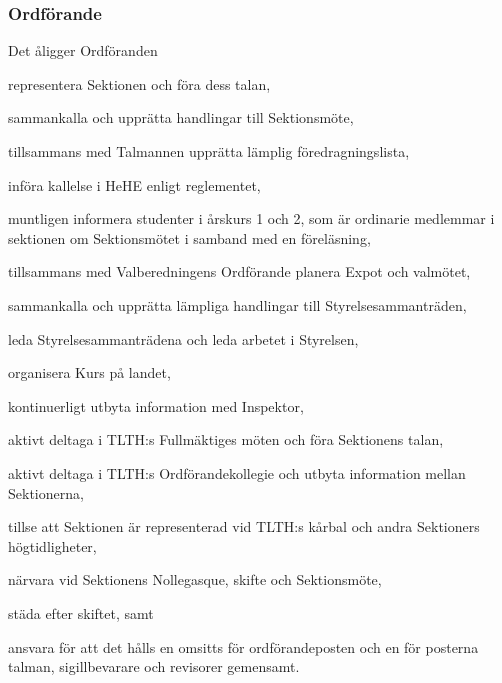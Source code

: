 \documentclass[10pt]{article}
\begin{document}
\subsubsection{Ordförande}
Det åligger Ordföranden
\begin{attlist}
    \item representera Sektionen och föra dess talan,
    \item sammankalla och upprätta handlingar till Sektionsmöte,
    \item tillsammans med Talmannen upprätta lämplig föredragningslista,
    \item införa kallelse i HeHE enligt reglementet,
    \item muntligen informera studenter i årskurs 1 och 2, som är ordinarie medlemmar i sektionen om Sektionsmötet i samband med en föreläsning,
    \item tillsammans med Valberedningens Ordförande planera Expot och valmötet,
    \item sammankalla och upprätta lämpliga handlingar till Styrelsesammanträden,
    \item leda Styrelsesammanträdena och leda arbetet i Styrelsen,
    \item organisera Kurs på landet,
    \item kontinuerligt utbyta information med Inspektor,
    \item aktivt deltaga i TLTH:s Fullmäktiges möten och föra Sektionens talan,
    \item aktivt deltaga i TLTH:s Ordförandekollegie och utbyta information mellan Sektionerna,
    \item tillse att Sektionen är representerad vid TLTH:s kårbal och andra Sektioners högtidligheter,
    \item närvara vid Sektionens Nollegasque, skifte och Sektionsmöte,
    \item städa efter skiftet, samt
    \item ansvara för att det hålls en omsitts för ordförandeposten och en för posterna talman, sigillbevarare och revisorer gemensamt.
\end{attlist}
\end{document}
